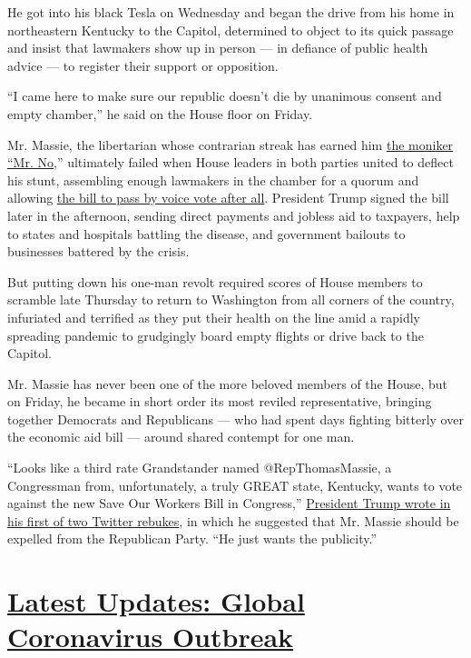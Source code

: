 He got into his black Tesla on Wednesday and began the drive from his
home in northeastern Kentucky to the Capitol, determined to object to
its quick passage and insist that lawmakers show up in person --- in
defiance of public health advice --- to register their support or
opposition.

``I came here to make sure our republic doesn't die by unanimous consent
and empty chamber,'' he said on the House floor on Friday.

Mr. Massie, the libertarian whose contrarian streak has earned him
\href{https://www.politico.com/story/2013/01/kentucky-rep-earns-name-for-himself-by-voting-no-086318}{the
moniker} \href{https://www.youtube.com/watch?v=HTSqyyOC4Jc}{``Mr. No,}''
ultimately failed when House leaders in both parties united to deflect
his stunt, assembling enough lawmakers in the chamber for a quorum and
allowing
\href{https://www.nytimes.com/2020/03/27/us/politics/coronavirus-house-voting.html}{the
bill to pass by voice vote after all}. President Trump signed the bill
later in the afternoon, sending direct payments and jobless aid to
taxpayers, help to states and hospitals battling the disease, and
government bailouts to businesses battered by the crisis.

But putting down his one-man revolt required scores of House members to
scramble late Thursday to return to Washington from all corners of the
country, infuriated and terrified as they put their health on the line
amid a rapidly spreading pandemic to grudgingly board empty flights or
drive back to the Capitol.

Mr. Massie has never been one of the more beloved members of the House,
but on Friday, he became in short order its most reviled representative,
bringing together Democrats and Republicans --- who had spent days
fighting bitterly over the economic aid bill --- around shared contempt
for one man.

``Looks like a third rate Grandstander named @RepThomasMassie, a
Congressman from, unfortunately, a truly GREAT state, Kentucky, wants to
vote against the new Save Our Workers Bill in Congress,''
\href{https://twitter.com/realDonaldTrump/status/1243534441772974081}{President
Trump wrote in his first of two Twitter rebukes}, in which he suggested
that Mr. Massie should be expelled from the Republican Party. ``He just
wants the publicity.''

\hypertarget{latest-updates-global-coronavirus-outbreak}{%
\section{\texorpdfstring{\href{https://www.nytimes.com/2020/08/01/world/coronavirus-covid-19.html?action=click\&pgtype=Article\&state=default\&region=MAIN_CONTENT_1\&context=storylines_live_updates}{Latest
Updates: Global Coronavirus
Outbreak}}{Latest Updates: Global Coronavirus Outbreak}}\label{latest-updates-global-coronavirus-outbreak}}

